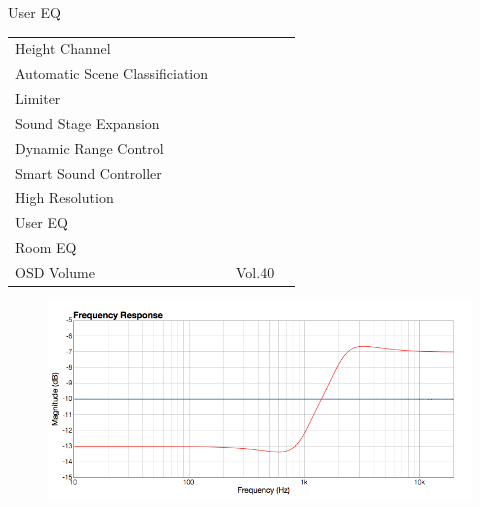 \documentclass{beamer}
\begin{document}
\begin{frame}[t]{User EQ}
\begin{tiny}
\begin{tabular}{@{}lccc@{}}
Height Channel & \color{black}{Off} & & \\
Automatic Scene Classificiation & \color{black}{Off} & & \\
Limiter & \color{black}{Off} & & \\
Sound Stage Expansion & \color{black}{Off} & & \\
Dynamic Range Control & \color{black}{Off} & & \\
Smart Sound Controller & \color{black}{Off} & & \\
High Resolution & \color{black}{Off} & & \\
User EQ & \color{blue}{On} & & \\
Room EQ & \color{black}{Off} & & \\
OSD Volume & \color{blue}{On} & Vol.40 & \\
\midrule
\end{tabular}
\end{tiny}

\begin{figure}[b]
\includegraphics[height=0.32\textwidth]{figure/usereq.png}
\end{figure}

\end{frame}
\end{document}
